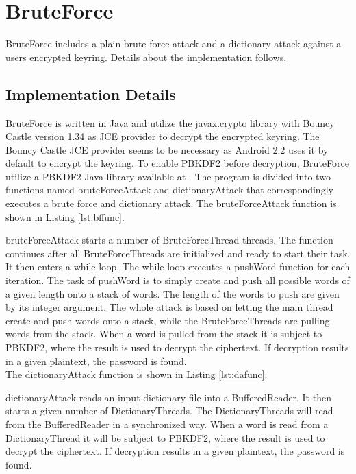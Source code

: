 \documentclass[pdftex,english,10pt,b5paper,twoside]{book}
\begin{document}
\section{BruteForce}
BruteForce includes a plain brute force attack and a dictionary attack against
a users encrypted keyring. Details about the implementation follows.

\subsection{Implementation Details}
BruteForce is written in Java and utilize the javax.crypto library with Bouncy
Castle version 1.34 as JCE provider to decrypt the encrypted keyring. The Bouncy
Castle JCE provider seems to be necessary as Android 2.2 uses it by default to encrypt
the keyring. To enable PBKDF2 before decryption, BruteForce utilize a PBKDF2
Java library available at \cite{pbkdf2}. The program is divided into two
functions named bruteForceAttack and dictionaryAttack that correspondingly executes a brute
force and dictionary attack. The bruteForceAttack function is shown in Listing
\ref{lst:bffunc}.

 

\noindent bruteForceAttack starts a number of BruteForceThread threads. The
function continues after all BruteForceThreads are initialized and ready to
start their task. It then enters a while-loop. The while-loop executes a pushWord function for each iteration.
The task of pushWord is to simply create and push all possible words of a given length onto
a stack of words. The length of the words to push are given by its integer
argument. The whole attack is based on letting the main thread create and 
push words onto a stack, while the BruteForceThreads are
pulling words from the stack. When a word is pulled from the stack it is
subject to PBKDF2, where the result is used to decrypt the ciphertext. If
decryption results in a given plaintext, the password is found.\\

\noindent The dictionaryAttack function is shown in Listing \ref{lst:dafunc}.



dictionaryAttack reads an input dictionary file into a BufferedReader. It then starts
a given number of DictionaryThreads. The DictionaryThreads will read
from the BufferedReader in a synchronized way. When a word is read from a
DictionaryThread it will be subject to PBKDF2, where the result is used to
decrypt the ciphertext. If decryption results in a given
plaintext, the password is found.
\end{document}
